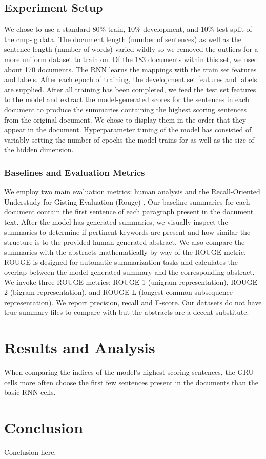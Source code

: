 \documentclass[11pt]{article}
\begin{document}
	\subsection{Experiment Setup} 
		We chose to use a standard 80\% train, 10\% development, and 10\% test split of the cmp-lg data. The document length (number of sentences) as well as the sentence length (number of words) varied wildly so we removed the outliers for a more uniform dataset to train on. Of the 183 documents within this set, we used about 170 documents.
		The RNN learns the mappings with the train set features and labels. After each epoch of training, the development set features and labels are supplied. After all training has been completed, we feed the test set features to the model and extract the model-generated scores for the sentences in each document to produce the summaries containing the highest scoring sentences from the original document. We chose to display them in the order that they appear in the document. Hyperparameter tuning of the model has consisted of variably setting the number of epochs the model trains for as well as the size of the hidden dimension. 
		\subsubsection{Baselines and Evaluation Metrics}
			We employ two main evaluation metrics: human analysis and the Recall-Oriented Understudy for Gisting Evaluation (Rouge) \cite{ganesan2015}. Our baseline summaries for each document contain the first sentence of each paragraph present in the document text. After the model has generated summaries, we visually inspect the summaries to determine if pertinent keywords are present and how similar the structure is to the provided human-generated abstract. We also compare the summaries with the abstracts mathematically by way of the ROUGE metric. ROUGE is designed for automatic summarization tasks and calculates the overlap between the model-generated summary and the corresponding abstract. We invoke three ROUGE metrics: ROUGE-1 (unigram representation), ROUGE-2 (bigram representation), and ROUGE-L (longest common subsequence representation). We report precision, recall and F-score. Our datasets do not have true summary files to compare with but the abstracts are a decent substitute.
			
\section{Results and Analysis} %
	When comparing the indices of the model's highest scoring sentences, the GRU cells more often choose the first few sentences present in the documents than the basic RNN cells.
\section{Conclusion}
	Conclusion here.



\end{document}
